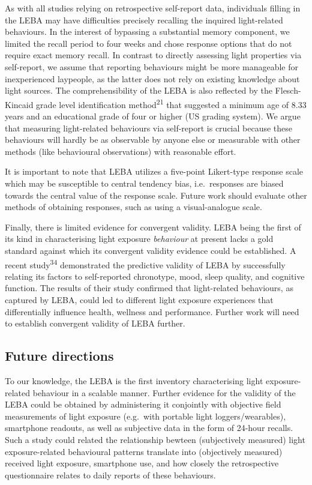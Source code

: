 \documentclass[
  man]{apa6}
\begin{document}
As with all studies relying on retrospective self-report data, individuals filling in the LEBA may have difficulties precisely recalling the inquired light-related behaviours. In the interest of bypassing a substantial memory component, we limited the recall period to four weeks and chose response options that do not require exact memory recall. In contrast to directly assessing light properties via self-report, we assume that reporting behaviours might be more manageable for inexperienced laypeople, as the latter does not rely on existing knowledge about light sources. The comprehensibility of the LEBA is also reflected by the Flesch-Kincaid grade level identification method\textsuperscript{21} that suggested a minimum age of 8.33 years and an educational grade of four or higher (US grading system). We argue that measuring light-related behaviours via self-report is crucial because these behaviours will hardly be as observable by anyone else or measurable with other methods (like behavioural observations) with reasonable effort.

It is important to note that LEBA utilizes a five-point Likert-type response scale which may be susceptible to central tendency bias, i.e.~responses are biased towards the central value of the response scale. Future work should evaluate other methods of obtaining responses, such as using a visual-analogue scale.

Finally, there is limited evidence for convergent validity. LEBA being the first of its kind in characterising light exposure \emph{behaviour} at present lacks a gold standard against which its convergent validity evidence could be established. A recent study\textsuperscript{34} demonstrated the predictive validity of LEBA by successfully relating its factors to self-reported chronotype, mood, sleep quality, and cognitive function. The results of their study confirmed that light-related behaviours, as captured by LEBA, could led to different light exposure experiences that differentially influence health, wellness and performance. Further work will need to establish convergent validity of LEBA further.

\hypertarget{future-directions}{%
\subsection{Future directions}\label{future-directions}}

To our knowledge, the LEBA is the first inventory characterising light exposure-related behaviour in a scalable manner. Further evidence for the validity of the LEBA could be obtained by administering it conjointly with objective field measurements of light exposure (e.g.~with portable light loggers/wearables), smartphone readouts, as well as subjective data in the form of 24-hour recalls. Such a study could related the relationship bewteen (subjectively measured) light exposure-related behavioural patterns translate into (objectively measured) received light exposure, smartphone use, and how closely the retrospective questionnaire relates to daily reports of these behaviours.
\end{document}
